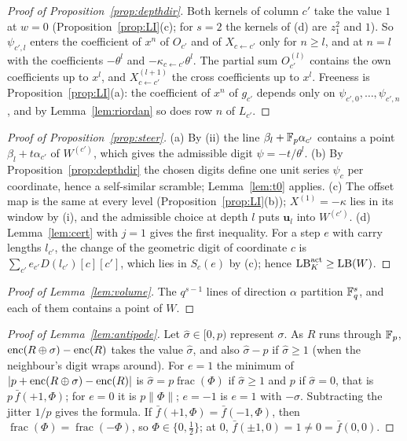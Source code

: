 \begin{proof}[Proof of Proposition~\ref{prop:depthdir}]
Both kernels of column $c'$ take the value $1$ at $w=0$ (Proposition~\ref{prop:LI}(c); for $s=2$ the kernels of (d) are $z_1^2$ and $1$). So $\psi_{c',l}$ enters the coefficient of $x^n$ of $O_{c'}$ and of $X_{c\leftarrow c'}$ only for $n\ge l$, and at $n=l$ with the coefficients $-\theta^l$ and $-\kappa_{c\leftarrow c'}\theta^l$. The partial sum $O_{c'}^{(l)}$ contains the own coefficients up to $x^l$, and $X^{(l+1)}_{c\leftarrow c'}$ the cross coefficients up to $x^l$. Freeness is Proposition~\ref{prop:LI}(a): the coefficient of $x^n$ of $g_{c'}$ depends only on $\psi_{c',0},\dots,\psi_{c',n}$, and by Lemma~\ref{lem:riordan} so does row $n$ of $L_{c'}$.
\end{proof}

\begin{proof}[Proof of Proposition~\ref{prop:steer}]
(a) By (ii) the line $\beta_l+\mathbb{F}_p\alpha_{c'}$ contains a point $\beta_l+t\alpha_{c'}$ of $W^{(c')}$, which gives the admissible digit $\psi=-t/\theta^l$. (b) By Proposition~\ref{prop:depthdir} the chosen digits define one unit series $\psi_c$ per coordinate, hence a self-similar scramble; Lemma~\ref{lem:t0} applies. (c) The offset map is the same at every level (Proposition~\ref{prop:LI}(b)); $X^{(1)}=-\kappa$ lies in its window by (i), and the admissible choice at depth $l$ puts $\mathbf u_l$ into $W^{(c')}$. (d) Lemma~\ref{lem:cert} with $j=1$ gives the first inequality. For a step $e$ with carry lengths $l_{c'}$, the change of the geometric digit of coordinate $c$ is $\sum_{c'}e_{c'}D(l_{c'})[c][c']$, which lies in $S_c(e)$ by (c); hence $\mathrm{LB}^{\mathrm{act}}_K\ge\mathrm{LB}(W)$.
\end{proof}

\begin{proof}[Proof of Lemma~\ref{lem:volume}]
The $q^{s-1}$ lines of direction $\alpha$ partition $\mathbb{F}_q^s$, and each of them contains a point of $W$.
\end{proof}

\begin{proof}[Proof of Lemma~\ref{lem:antipode}]
Let $\hat\sigma\in[0,p)$ represent $\sigma$. As $R$ runs through $\mathbb{F}_p$, $\operatorname{enc}(R\oplus\sigma)-\operatorname{enc}(R)$ takes the value $\hat\sigma$, and also $\hat\sigma-p$ if $\hat\sigma\ge1$ (when the neighbour's digit wraps around). For $e=1$ the minimum of $|p+\operatorname{enc}(R\oplus\sigma)-\operatorname{enc}(R)|$ is $\hat\sigma=p\operatorname{frac}(\Phi)$ if $\hat\sigma\ge1$ and $p$ if $\hat\sigma=0$, that is $p\,\bar f(+1,\Phi)$; for $e=0$ it is $p\|\Phi\|$; $e=-1$ is $e=1$ with $-\sigma$. Subtracting the jitter $1/p$ gives the formula. If $\bar f(+1,\Phi)=\bar f(-1,\Phi)$, then $\operatorname{frac}(\Phi)=\operatorname{frac}(-\Phi)$, so $\Phi\in\{0,\frac12\}$; at $0$, $\bar f(\pm1,0)=1\ne0=\bar f(0,0)$.
\end{proof}

